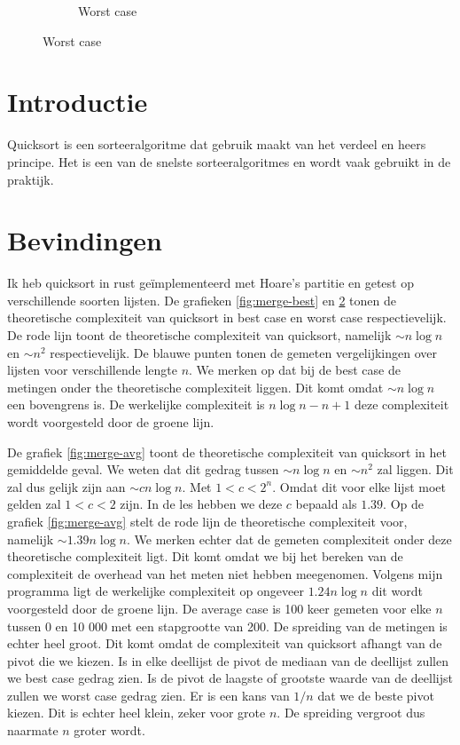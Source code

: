 \documentclass[a4paper]{article}
\begin{document}
\begin{figure}[h]
\begin{subfigure}[b]{0.3\textwidth}
    \caption{Worst case}
    \label{fig:merge-worst}
  \end{subfigure}
\end{figure}

\section{Introductie}
Quicksort is een sorteeralgoritme dat gebruik maakt van het verdeel en heers principe.
Het is een van de snelste sorteeralgoritmes en wordt vaak gebruikt in de praktijk.

\section{Bevindingen}
Ik heb quicksort in rust ge\"implementeerd met Hoare's partitie en getest op verschillende soorten lijsten.
De grafieken \ref{fig:merge-best} en \ref{fig:merge-worst} tonen de theoretische complexiteit van quicksort in best case en worst case respectievelijk.
De rode lijn toont de theoretische complexiteit van quicksort, namelijk $\sim n \log n$ en $\sim n^2$ respectievelijk.
De blauwe punten tonen de gemeten vergelijkingen over lijsten voor verschillende lengte $n$. 
We merken op dat bij de best case de metingen onder the theoretische complexiteit liggen. Dit komt omdat $\sim n \log n$ een bovengrens is.
De werkelijke complexiteit is $n \log n - n + 1$ deze complexiteit wordt voorgesteld door de groene lijn.
\par
De grafiek \ref{fig:merge-avg} toont de theoretische complexiteit van quicksort in het gemiddelde geval.
We weten dat dit gedrag tussen $\sim n \log n$ en $\sim n^2$ zal liggen. Dit zal dus gelijk zijn aan $\sim cn \log n$. Met $1<c<2^n$.
Omdat dit voor elke lijst moet gelden zal $1<c<2$ zijn. In de les hebben we deze $c$ bepaald als $1.39$. Op de grafiek \ref{fig:merge-avg} stelt de rode lijn de theoretische complexiteit voor, namelijk $\sim 1.39n \log n$.
We merken echter dat de gemeten complexiteit onder deze theoretische complexiteit ligt. Dit komt omdat we bij het bereken van de complexiteit de overhead van het meten niet hebben meegenomen.
Volgens mijn programma ligt de werkelijke complexiteit op ongeveer $1.24n \log n$ dit wordt voorgesteld door de groene lijn.
De average case is 100 keer gemeten voor elke $n$ tussen 0 en 10 000 met een stapgrootte van 200.
De spreiding van de metingen is echter heel groot. Dit komt omdat de complexiteit van quicksort afhangt van de pivot die we kiezen.
Is in elke deellijst de pivot de mediaan van de deellijst zullen we best case gedrag zien. Is de pivot de laagste of grootste waarde van de deellijst zullen we worst case gedrag zien.
Er is een kans van $1/n$ dat we de beste pivot kiezen. Dit is echter heel klein, zeker voor grote $n$. De spreiding vergroot dus naarmate $n$ groter wordt.
\end{document}
